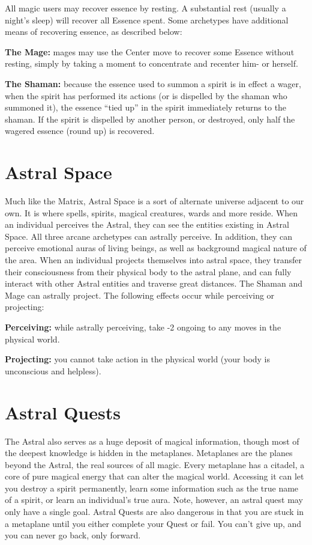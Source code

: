 All magic users may recover essence by resting. A substantial rest (usually a night’s sleep) will recover all Essence spent. Some archetypes have additional means of recovering essence, as described below:

\textbf{The Mage:} mages may use the Center move to recover some Essence without resting, simply by taking a moment to concentrate and recenter him- or herself.

\textbf{The Shaman:} because the essence used to summon a spirit is in effect a wager, when the spirit has performed its actions (or is dispelled by the shaman who summoned it), the essence “tied up” in the spirit immediately returns to the shaman. If the spirit is dispelled by another person, or destroyed, only half the wagered essence (round up) is recovered.



\section{Astral Space}

Much like the Matrix, Astral Space is a sort of alternate universe adjacent to our own. It is where spells, spirits, magical creatures, wards and more reside. When an individual perceives the Astral, they can see the entities existing in Astral Space. All three arcane archetypes can astrally perceive. In addition, they can perceive emotional auras of living beings, as well as background magical nature of the area. When an individual projects themselves into astral space, they transfer their consciousness from their physical body to the astral plane, and can fully interact with other Astral entities and traverse great distances. The Shaman and Mage can astrally project. The following effects occur while perceiving or projecting: 

\textbf{Perceiving:} while astrally perceiving, take -2 ongoing to any moves in the physical world.

\textbf{Projecting:} you cannot take action in the physical world (your body is unconscious and helpless).



\section{Astral Quests}

The Astral also serves as a huge deposit of magical information, though most of the deepest knowledge is hidden in the metaplanes. Metaplanes are the planes beyond the Astral, the real sources of all magic. Every metaplane has a citadel, a core of pure magical energy that can alter the magical world. Accessing it can let you destroy a spirit permanently, learn some information such as the true name of a spirit, or learn an individual’s true aura. Note, however, an astral quest may only have a single goal. Astral Quests are also dangerous in that you are stuck in a metaplane until you either complete your Quest or fail. You can’t give up, and you can never go back, only forward.


